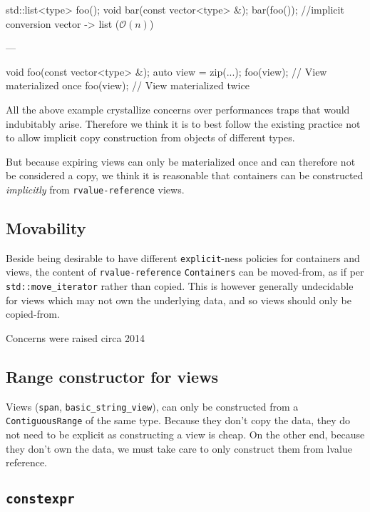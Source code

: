 \documentclass{wg21}
\newcommand{\cc}[1]{\texttt{#1}}
\begin{document}
\begin{codeblock}
    std::list<type> foo();
    void bar(const vector<type> &);
    bar(foo()); //implicit conversion vector -> list ($\mathcal{O}(n)$)
\end{codeblock}
---

\begin{codeblock}
    void foo(const vector<type> &);
    auto view = zip(...);
    foo(view); // View materialized once
    foo(view); // View materialized twice
\end{codeblock}

All the above example crystallize concerns over performances traps that would indubitably arise.
Therefore we think it is to best follow the existing practice not to allow implicit copy construction from objects of different types.

But because expiring views can only be materialized once and can therefore not be considered a copy, we think it is reasonable that
containers can be constructed \emph{implicitly} from \cc{rvalue-reference} views.

\subsection{Movability}

Beside being desirable to have different \cc{explicit}-ness policies for containers and views, the content of \cc{rvalue-reference} \cc{Containers}
can be moved-from, as if per \cc{std::move_iterator} rather than copied.
This is however generally undecidable for views which may not own the underlying data, and so views should only be copied-from.

Concerns were raised circa 2014

\subsection{Range constructor for views}

Views (\cc{span}, \cc{basic_string_view}), can only be constructed from a \cc{ContiguousRange} of the same type.
Because they don't copy the data, they do not need to be explicit as constructing a view is cheap.
On the other end, because they don't own the data, we must take care to only construct them from lvalue reference.

\subsection{\cc{constexpr}}
\end{document}
